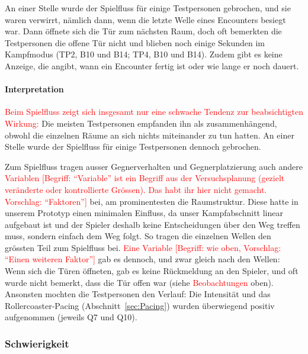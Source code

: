 \documentclass[../Main.tex]{subfiles}
\begin{document}
An einer Stelle wurde der Spielfluss für einige Testpersonen gebrochen, und sie waren verwirrt, nämlich dann, wenn die letzte Welle eines Encounters besiegt war. Dann öffnete sich die Tür zum nächsten Raum, doch oft bemerkten die Testpersonen die offene Tür nicht und blieben noch einige Sekunden im Kampfmodus (TP2, B10 und B14; TP4, B10 und B14). Zudem gibt es keine Anzeige, die angibt, wann ein Encounter fertig ist oder wie lange er noch dauert.

\paragraph{Interpretation}
\textcolor{red}{Beim Spielfluss zeigt sich insgesamt nur eine schwache Tendenz zur beabsichtigten Wirkung:} Die meisten Testpersonen empfanden ihn als zusammenhängend, obwohl die einzelnen Räume an sich nichts miteinander zu tun hatten. An einer Stelle wurde der Spielfluss für einige Testpersonen dennoch gebrochen.

Zum Spielfluss tragen ausser Gegnerverhalten und Gegnerplatzierung auch andere \textcolor{red}{Variablen [Begriff: \enquote{Variable} ist ein Begriff aus der Versuchsplanung (gezielt veränderte oder kontrollierte Grössen). Das habt ihr hier nicht gemacht. Vorschlag: \enquote{Faktoren}]} bei, am prominentesten die Raumstruktur. Diese hatte in unserem Prototyp einen minimalen Einfluss, da unser Kampfabschnitt linear aufgebaut ist und der Spieler deshalb keine Entscheidungen über den Weg treffen muss, sondern einfach dem Weg folgt. So tragen die einzelnen Wellen den grössten Teil zum Spielfluss bei. \textcolor{red}{Eine Variable [Begriff: wie oben, Vorschlag: \enquote{Einen weiteren Faktor}]} gab es dennoch, und zwar gleich nach den Wellen: Wenn sich die Türen öffneten, gab es keine Rückmeldung an den Spieler, und oft wurde nicht bemerkt, dass die Tür offen war (siehe \textcolor{red}{Beobachtungen} oben). Ansonsten mochten die Testpersonen den Verlauf: Die Intensität und das Rollercoaster-Pacing (Abschnitt~\ref{sec:Pacing}) wurden überwiegend positiv aufgenommen (jeweils Q7 und Q10).

\subsubsection{Schwierigkeit}
\end{document}
